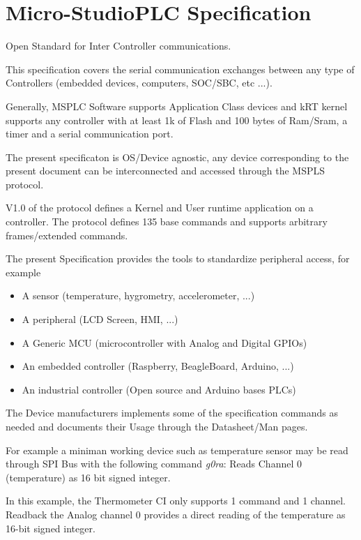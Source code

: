 \documentclass[12pt]{article}
\begin{document}
	
	\section*{Micro-StudioPLC Specification}
	
	Open Standard for Inter Controller communications.

	This specification covers the serial communication exchanges between any type of Controllers
	(embedded devices, computers, SOC/SBC, etc ...).

	Generally, MSPLC Software supports Application Class devices and kRT kernel supports any controller
	with at least 1k of Flash and 100 bytes of Ram/Sram, a timer and a serial communication port.

	The present specificaton is OS/Device agnostic, any device corresponding to the present document can
	be interconnected and accessed through the MSPLS protocol.

	V1.0 of the protocol defines a Kernel and User runtime application on a controller.
	The protocol defines 135 base commands and supports arbitrary frames/extended commands.

	The present Specification provides the tools to standardize peripheral access, for example

	\begin{itemize}
		\item A sensor (temperature, hygrometry, accelerometer, ...)
		\item A peripheral (LCD Screen, HMI, ...)
		\item A Generic MCU (microcontroller with Analog and Digital GPIOs)
		\item An embedded controller (Raspberry, BeagleBoard, Arduino, ...)
		\item An industrial controller (Open source and Arduino bases PLCs)
	\end{itemize}

	The Device manufacturers implements some of the specification commands as needed
	and documents their Usage through the Datasheet/Man pages.

	For example a miniman working device such as temperature sensor may be read through SPI Bus with the following command
	\emph{g0ra}: Reads Channel 0 (temperature) as 16 bit signed integer.

	In this example, the Thermometer CI only supports 1 command and 1 channel. Readback the Analog channel 0 provides
	a direct reading of the temperature as 16-bit signed integer.
\end{document}
